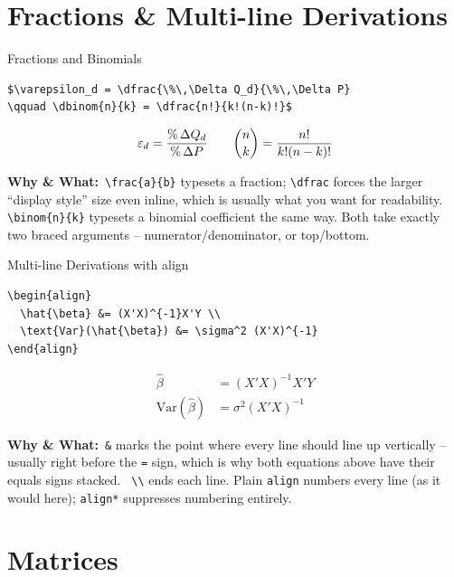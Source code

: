 \documentclass[11pt,aspectratio=169]{beamer}
\newcommand{\whybox}[1]{%
  \vspace{2pt}
  {\scriptsize\raggedright\textcolor{red!55!black}{\textbf{Why \& What:}}~#1\par}
}
\begin{document}
\section{Fractions \& Multi-line Derivations}

\begin{frame}[fragile]{Fractions and Binomials}
  \begin{lstlisting}
$\varepsilon_d = \dfrac{\%\,\Delta Q_d}{\%\,\Delta P}
\qquad \dbinom{n}{k} = \dfrac{n!}{k!(n-k)!}$
  \end{lstlisting}
  \begin{outputbox}
    \[ \varepsilon_d = \dfrac{\%\,\Delta Q_d}{\%\,\Delta P}
       \qquad \dbinom{n}{k} = \dfrac{n!}{k!(n-k)!} \]
  \end{outputbox}
  \whybox{\texttt{\textbackslash frac\{a\}\{b\}} typesets a fraction;
  \texttt{\textbackslash dfrac} forces the larger ``display style''
  size even inline, which is usually what you want for readability.
  \texttt{\textbackslash binom\{n\}\{k\}} typesets a binomial
  coefficient the same way. Both take exactly two braced arguments --
  numerator/denominator, or top/bottom.}
\end{frame}

\begin{frame}[fragile]{Multi-line Derivations with align}
  \begin{lstlisting}
\begin{align}
  \hat{\beta} &= (X'X)^{-1}X'Y \\
  \text{Var}(\hat{\beta}) &= \sigma^2 (X'X)^{-1}
\end{align}
  \end{lstlisting}
  \begin{outputbox}
    \begin{align*}
      \hat{\beta} &= (X'X)^{-1}X'Y \\
      \mathrm{Var}(\hat{\beta}) &= \sigma^2 (X'X)^{-1}
    \end{align*}
  \end{outputbox}
  \whybox{\texttt{\&} marks the point where every line should line up
  vertically -- usually right before the \texttt{=} sign, which is why
  both equations above have their equals signs stacked. \texttt{
  \textbackslash\textbackslash} ends each line. Plain \texttt{align}
  numbers every line (as it would here); \texttt{align*} suppresses
  numbering entirely.}
\end{frame}

\section{Matrices}
\end{document}
